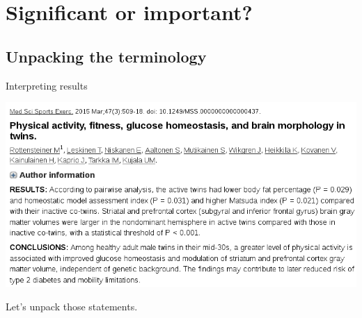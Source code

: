 \section{Significant or important?}

\subsection{Unpacking the terminology}


\begin{frame}{Interpreting results}

  \begin{center}
    \includegraphics[width=\textwidth]{examples/twins-exercise_abstract_results}
  \end{center}

  \vspace{2em}

  Let's unpack those statements.

\end{frame}

